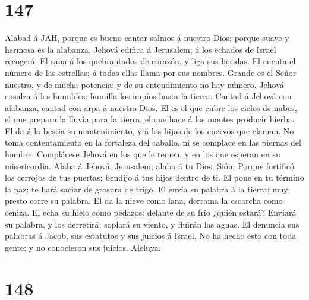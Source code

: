 \hypertarget{section-146}{%
\section{147}\label{section-146}}

 Alabad á JAH, porque es bueno cantar salmos á nuestro Dios;
porque suave y hermosa es la alabanza.  Jehová edifica á
Jerusalem; á los echados de Israel recogerá.  El sana á los
quebrantados de corazón, y liga sus heridas.  El cuenta el
número de las estrellas; á todas ellas llama por sus nombres.
 Grande es el Señor nuestro, y de mucha potencia; y de su
entendimiento no hay número.  Jehová ensalza á los humildes;
humilla los impíos hasta la tierra.  Cantad á Jehová con
alabanza, cantad con arpa á nuestro Dios.  El es el que
cubre los cielos de nubes, el que prepara la lluvia para la tierra, el
que hace á los montes producir hierba.  El da á la bestia su
mantenimiento, y á los hijos de los cuervos que claman.  No
toma contentamiento en la fortaleza del caballo, ni se complace en las
piernas del hombre.  Complácese Jehová en los que le temen,
y en los que esperan en su misericordia.  Alaba á Jehová,
Jerusalem; alaba á tu Dios, Sión.  Porque fortificó los
cerrojos de tus puertas; bendijo á tus hijos dentro de ti. 
El pone en tu término la paz; te hará saciar de grosura de trigo.
 El envía su palabra á la tierra; muy presto corre su
palabra.  El da la nieve como lana, derrama la escarcha
como ceniza.  El echa su hielo como pedazos: delante de su
frío ¿quién estará?  Enviará su palabra, y los derretirá:
soplará su viento, y fluirán las aguas.  El denuncia sus
palabras á Jacob, sus estatutos y sus juicios á Israel.  No
ha hecho esto con toda gente; y no conocieron sus juicios. Aleluya.

\hypertarget{section-147}{%
\section{148}\label{section-147}}

